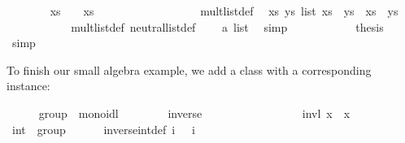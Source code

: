 \begin{isabellebody}
\ \ \ \ \ \ \isamarkupfalse%
\ {\isachardoublequoteopen}xs\ {\isasymotimes}\ {\isasymone}\ {\isacharequal}\ xs{\isachardoublequoteclose}\isanewline
\ \ \ \ \ \ \isamarkupfalse%
\ {\isacharminus}\isanewline
\ \ \ \ \ \ \ \ \isamarkupfalse%
\ mult{\isacharunderscore}list{\isacharunderscore}def\ \isamarkupfalse%
\ {\isachardoublequoteopen}{\isasymAnd}xs\ ys{\isasymColon}{\isasymalpha}\ list{\isachardot}\ xs\ {\isasymotimes}\ ys\ {\isasymequiv}\ xs\ {\isacharat}\ ys{\isachardoublequoteclose}\ \isacommand{{\isachardot}}\isamarkupfalse%
\isanewline
\ \ \ \ \ \ \ \ \isamarkupfalse%
\ \isamarkupfalse%
\ mult{\isacharunderscore}list{\isacharunderscore}def\ neutral{\isacharunderscore}list{\isacharunderscore}def\ \isamarkupfalse%
\ {\isachardoublequoteopen}{\isasymone}\ {\isasymequiv}\ {\isacharbrackleft}{\isacharbrackright}{\isasymColon}{\isacharprime}a\ list{\isachardoublequoteclose}\ \isamarkupfalse%
\ simp\isanewline
\ \ \ \ \ \ \ \ \isamarkupfalse%
\ \isamarkupfalse%
\ {\isacharquery}thesis\ \isamarkupfalse%
\ simp\isanewline
\ \ \ \ \ \ \isamarkupfalse%
\isanewline
\ \ \ \ \isamarkupfalse%
%
\endisatagproof
{\isafoldproof}%
%
\isadelimproof
%
\endisadelimproof
%
\begin{isamarkuptext}%
\noindent To finish our small algebra example, we add a  class
  with a corresponding instance:%
\end{isamarkuptext}%
\isamarkuptrue%
\ \ \ \ \isamarkupfalse%
\ group\ {\isacharequal}\ monoidl\ {\isacharplus}\isanewline
\ \ \ \ \ \ \ inverse\ {\isacharcolon}{\isacharcolon}\ {\isachardoublequoteopen}{\isasymalpha}\ {\isasymRightarrow}\ {\isasymalpha}{\isachardoublequoteclose}\ \ \ \ {\isacharparenleft}{\isachardoublequoteopen}{\isacharparenleft}{\isacharunderscore}\isactrlloc {\isasymdiv}{\isacharparenright}{\isachardoublequoteclose}\ {\isacharbrackleft}{}{}{}{}{\isacharbrackright}\ {}{}{}{\isacharparenright}\isanewline
\ \ \ \ \ \ \ invl{\isacharcolon}\ {\isachardoublequoteopen}x\isactrlloc {\isasymdiv}\ \isactrlloc {\isasymotimes}\ x\ {\isacharequal}\ \isactrlloc {\isasymone}{\isachardoublequoteclose}\isanewline
\isanewline
\ \ \ \ \isamarkupfalse%
\ int\ {\isacharcolon}{\isacharcolon}\ group\isanewline
\ \ \ \ \ \ inverse{\isacharunderscore}int{\isacharunderscore}def{\isacharcolon}\ {\isachardoublequoteopen}i{\isasymdiv}\ {\isasymequiv}\ {\isacharminus}\ i{\isachardoublequoteclose}\isanewline

\end{isabellebody}
